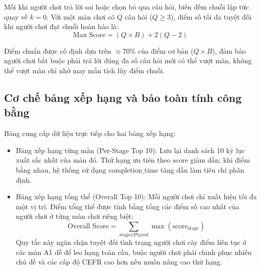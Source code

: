 Mỗi khi người chơi trả lời sai hoặc chọn bỏ qua câu hỏi, biến đếm chuỗi lập tức quay về $k = 0$. Với một màn chơi có $Q$ câu hỏi ($Q \ge 3$), điểm số tối đa tuyệt đối khi người chơi đạt chuỗi hoàn hảo là:
\begin{equation}
\label{eq:max_streak_score}
\text{Max Score} = (Q \times B) + 2(Q - 2)
\end{equation}

Điểm chuẩn  được cố định dựa trên $\approx 70\%$ của điểm cơ bản ($Q \times B$), đảm bảo người chơi bắt buộc phải trả lời đúng đa số câu hỏi mới có thể vượt màn, không thể vượt màn chỉ nhờ may mắn tích lũy điểm chuỗi.

\subsection{Cơ chế bảng xếp hạng và bảo toàn tính công bằng}
\label{subsec:leaderboard_rules}

Bảng  cung cấp dữ liệu trực tiếp cho hai bảng xếp hạng:
\begin{itemize}
    \item Bảng xếp hạng từng màn (Per-Stage Top 10): Lưu lại danh sách 10 kỷ lục xuất sắc nhất của màn đó. Thứ hạng ưu tiên theo $\text{score}$ giảm dần; khi điểm bằng nhau, hệ thống sử dụng $\text{completion\_time}$ tăng dần làm tiêu chí phân định.
    \item Bảng xếp hạng tổng thể (Overall Top 10): Mỗi người chơi chỉ xuất hiện tối đa một vị trí. Điểm tổng thể được tính bằng tổng các điểm số cao nhất của người chơi ở từng màn chơi riêng biệt:
    \begin{equation}
    \label{eq:overall_score}
    \text{Overall Score} = \sum_{\text{stage} \in \text{Played}} \max(\text{score}_{\text{stage}})
    \end{equation}
    Quy tắc này ngăn chặn tuyệt đối tình trạng người chơi cày điểm liên tục ở các màn A1 dễ để leo hạng toàn cầu, buộc người chơi phải chinh phục nhiều chủ đề và các cấp độ CEFR cao hơn nếu muốn nâng cao thứ hạng.
\end{itemize}


